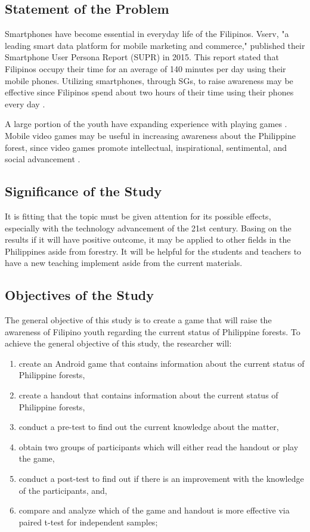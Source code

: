 \documentclass[journal]{./IEEE/IEEEtran}
\begin{document}
\subsection{Statement of the Problem}
Smartphones have become essential in everyday life of the Filipinos. Vserv, "a leading smart data platform for mobile marketing and commerce," published their Smartphone User Persona Report (SUPR) in 2015. This report stated that Filipinos occupy their time for an average of 140 minutes per day using their mobile phones. Utilizing smartphones, through SGs, to raise awareness may be effective since Filipinos spend about two hours of their time using their phones every day \cite{vserv2016unveils}.

A large portion of the youth have expanding experience with playing games \cite{degloria2014serious}. Mobile video games may be useful in increasing awareness about the Philippine forest, since video games promote intellectual, inspirational, sentimental, and social advancement \cite{granic2014benefits}. 

\subsection{Significance of the Study}
It is fitting that the topic must be given attention for its possible effects, especially with the technology advancement of the 21st century. Basing on the results if it will have positive outcome, it may be applied to other fields in the Philippines aside from forestry. It will be helpful for the students and teachers to have a new teaching implement aside from the current materials.
\\

\subsection{Objectives of the Study}
The general objective of this study is to create a game that will raise the awareness of Filipino youth regarding the current status of Philippine forests. To achieve the general objective of this study, the researcher will: 
\begin{enumerate}
\item create an Android game that contains information about the current status of Philippine forests,
\item create a handout that contains information about the current status of Philippine forests,
\item conduct a pre-test to find out the current knowledge about the matter,
\item obtain two groups of participants which will either read the handout or play the game,
\item conduct a post-test to find out if there is an improvement with the knowledge of the participants, and,
\item compare and analyze which of the game and handout is more effective via paired t-test for independent samples;
\end{enumerate}
\end{document}
